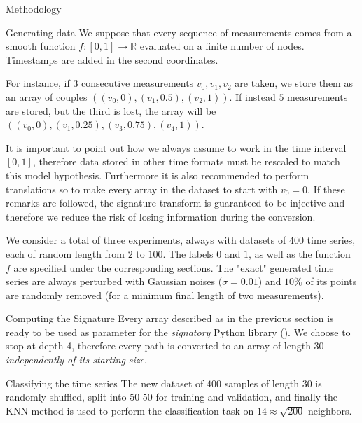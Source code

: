 \documentclass[twocolumn,9pt]{article}
\theoremstyle{definition}
\theoremstyle{remark}
\begin{document}
\begin{section}{Methodology}

\begin{subsection}{Generating data}
We suppose that every sequence of measurements comes from
a smooth function $f: [0, 1] \to \mathbb{R}$ evaluated on a finite
number of nodes. Timestamps are added in the second coordinates.

For instance, if $3$ consecutive measurements $v_0, v_1, v_2$ are taken,
we store them as an array of couples $((v_0, 0), (v_1, 0.5), (v_2, 1))$.
If instead $5$ measurements are stored, but the third is lost,
the array will be $((v_0, 0), (v_1, 0.25), (v_3, 0.75), (v_4, 1))$.

It is important to point out how we always assume to work in the time
interval $[0, 1]$, therefore data stored in other time formats must be 
rescaled to match this model hypothesis. Furthermore it is also recommended
to perform translations so to make every array in the dataset
to start with $v_0 = 0$.
If these remarks are followed,
the signature transform is guaranteed to be injective and therefore 
we reduce the risk of losing information during the conversion.


We consider a total of three experiments,
always with datasets of $400$ time series,
each of random length from $2$ to $100$.
The labels $0$ and $1$, as well as the function $f$ 
 are specified under the corresponding sections.
The "exact" generated time series
are always perturbed with Gaussian noises ($\sigma = 0.01$)
and $10\%$ of its points are randomly removed
(for a minimum final length of two measurements).
\end{subsection}


\begin{subsection}{Computing the Signature}
Every array described as in the previous section is ready to
be used as parameter for the \emph{signatory} Python library 
(\cite{Signatory}).
We choose to stop at depth 4, therefore every path is converted to
an array of length $30$ 
\emph{independently of its starting size}.
\end{subsection}

\begin{subsection}{Classifying the time series}
The new dataset of $400$ samples of length $30$ is randomly shuffled,
split into $50$-$50$ for training and validation,
and finally the 
KNN method is used to perform the classification task on
$14 \approx \sqrt{200}$ neighbors. 
\end{subsection}


\end{section}
\end{document}
